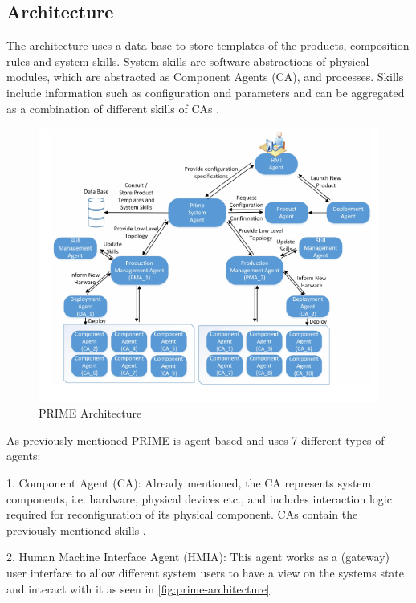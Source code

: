 \documentclass[conference,compsoc,hidelinks]{IEEEtran}
\begin{document}
\subsection{Architecture}
The architecture uses a data base to store templates of the products, composition rules and system skills. System skills are software abstractions of physical modules, which are abstracted as Component Agents (CA), and processes. Skills include information such as configuration and parameters and can be aggregated as a combination of different skills of CAs \cite{Hybrid}.

\begin{figure}[ht]
	\includegraphics[width=\columnwidth]{img/PRIME-Architecture.png}
	\caption{PRIME Architecture \cite{Hybrid}}
	\label{fig:prime-architecture}
\end{figure}
\noindent
As previously mentioned PRIME is agent based and uses 7 different types of agents:

1. Component Agent (CA): Already mentioned, the CA represents system components, i.e. hardware, physical devices etc., and includes interaction logic required for reconfiguration of its physical component. CAs contain the previously mentioned skills \cite{Hybrid}.

2. Human Machine Interface Agent (HMIA): This agent works as a (gateway) user interface to allow different system users to have a view on the systems state and interact with it as seen in \autoref{fig:prime-architecture}.
\end{document}
